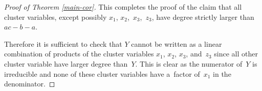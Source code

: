 \begin{proof}[Proof of Theorem \ref{main-cor}]
This completes the proof of the claim that all cluster variables, except possibly $x_1$, $x_2$,~$x_3$,~$z_3$, have degree strictly larger than $ac-b-a$.

Therefore it is suf\/f\/icient to check that $Y$ cannot be written as a linear combination of products of the cluster variables $x_1$, $x_2$, $x_3$, and~$z_3$ since all other cluster variable have larger degree than~$Y$. This is clear as the numerator of~$Y$ is irreducible and none of these cluster variables have a~factor of~$x_1$ in the denominator.
\end{proof}
